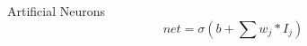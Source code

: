 \documentclass[final]{beamer}
\newlength{\colwidth}
\begin{document}
\begin{frame}[t]
\begin{columns}[t]
\begin{column}{\colwidth}
\begin{block}{Artificial Neurons}
    \begin{equation}
      \label{Formula:Gen2ANN}
      net = \sigma \left( b + \sum w_{j}*I_{j} \right)
    \end{equation}









\end{block}
\end{column}
\end{columns}
\end{frame}
\end{document}
